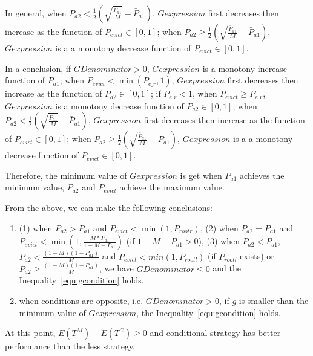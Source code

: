 \begin{enumerate}
In general, when $P_{a2}< \frac{1}{2}(\sqrt{\frac{\bar{P}_{a1}}{M}}-\bar{P}_{a1})$, $Gexpression$ first decreases then increase as the function of $P_{evict} \in [0,1]$; when $P_{a2}\geq \frac{1}{2}(\sqrt{\frac{\bar{P}_{a1}}{M}}-\bar{P}_{a1})$, $Gexpression$ is a  a monotony decrease function of $P_{evict} \in [0,1]$.

In a conclusion, if $GDenominator > 0$,
$Gexpression$ is a monotony increase function of $P_{a1}$;
 when $P_{evict} < \min(P_{e\_r},1)$, $Gexpression$ first decreases then increase as the function of $P_{a2} \in [0,1]$;
 if $P_{e\_r} < 1$, when $P_{evict} \geq P_{e\_r}$, $Gexpression$ is a monotony decrease function of $P_{a2} \in [0,1]$;
when $P_{a2}< \frac{1}{2}(\sqrt{\frac{\bar{P}_{a1}}{M}}-\bar{P}_{a1})$, $Gexpression$ first decreases then increase as the function of $P_{evict} \in [0,1]$; when $P_{a2}\geq \frac{1}{2}(\sqrt{\frac{\bar{P}_{a1}}{M}}-\bar{P}_{a1})$, $Gexpression$ is a  a monotony decrease function of $P_{evict} \in [0,1]$.

Therefore, the minimum value of $Gexpression$ is get when $P_{a1}$ achieves the minimum value, $P_{a2}$ and $P_{evict}$ achieve the maximum value.
\end{enumerate}

From the above, we can make the following conclusions:
\begin{enumerate}
  \item
  (1) when $P_{a2}>P_{a1}$ and $P_{evict}< \min(1,P_{rootr})$,
  (2) when $P_{a2}=P_{a1}$ and $P_{evict}< \min(1,\frac{M*P_{a1}}{1-M-P_{a1}})$ (if $1-M-P_{a1}>0$),
  (3) when $P_{a2}<P_{a1}$, $P_{a2} < \frac{(1-M)(1-P_{a1})}{M}$ and $P_{evict}< min(1,P_{rootl})$ (if $P_{rootl}$ exists)
or $P_{a2}\geq \frac{(1-M)(1-P_{a1})}{M}$,
  we have $GDenominator\leq0$ and the Inequality~\ref{equ:gcondition} holds.

  \item
  when conditions are opposite, i.e. $GDenominator>0$,  if $g$ is smaller than the minimum value of $Gexpression$, the Inequality~\ref{equ:gcondition} holds.

\end{enumerate}
At this point, $E(T^{M}) - E(T^{C})\geq 0$ and conditional {\vwarm} strategy has better performance than the less {\vwarm} strategy.




